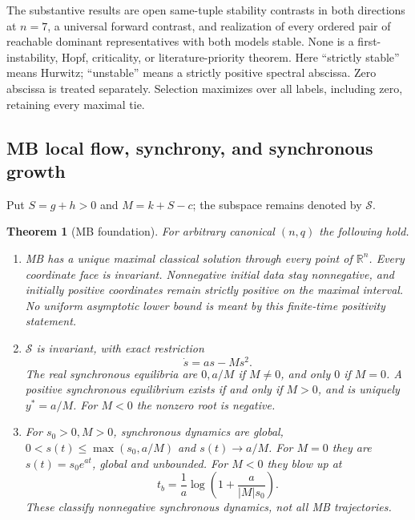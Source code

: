 \documentclass[11pt]{article}
\newcommand{\R}{\mathbb{R}}
\newcommand{\Sync}{\mathcal{S}}
\newtheorem{theorem}{Theorem}[section]
\theoremstyle{definition}
\theoremstyle{remark}
\begin{document}
The substantive results are open same-tuple stability contrasts in both
directions at $n=7$, a universal forward contrast, and realization of
every ordered pair of reachable dominant representatives with both
models stable. None is a first-instability, Hopf, criticality, or
literature-priority theorem. Here ``strictly stable'' means Hurwitz;
``unstable'' means a strictly positive spectral abscissa. Zero abscissa
is treated separately. Selection maximizes over all labels, including
zero, retaining every maximal tie.

\subsection{MB local flow, synchrony, and synchronous growth}
\label{slot:P08-1}
Put $S=g+h>0$ and $M=k+S-c$; the subspace remains denoted by $\Sync$.
\begin{theorem}[MB foundation]
\label{thm:P08-foundation}
For arbitrary canonical $(n,q)$ the following hold.
\begin{enumerate}[label=(\roman*),leftmargin=*]
\item MB has a unique maximal classical solution through every point of
$\R^n$. Every coordinate face is invariant. Nonnegative initial data
stay nonnegative, and initially positive coordinates remain strictly
positive on the maximal interval. No uniform asymptotic lower bound
is meant by this finite-time positivity statement.
\item $\Sync$ is invariant, with exact restriction
\begin{equation}
 \dot s=as-Ms^2.\label{eq:P08-scalar}
\end{equation}
The real synchronous equilibria are $0,a/M$ if $M\ne0$, and only $0$
if $M=0$. A positive synchronous equilibrium exists if and only if
$M>0$, and is uniquely $y^*=a/M$. For $M<0$ the nonzero root is negative.
\item For $s_0>0,M>0$, synchronous dynamics are global,
$0<s(t)\le\max(s_0,a/M)$ and $s(t)\to a/M$. For $M=0$ they are
$s(t)=s_0e^{at}$, global and unbounded. For $M<0$ they blow up at
\begin{equation}
 t_b=\frac1a\log\left(1+\frac{a}{|M|s_0}\right).
 \label{eq:P08-blowup}
\end{equation}
These classify nonnegative synchronous dynamics, not all MB trajectories.
\end{enumerate}
\end{theorem}
\end{document}
